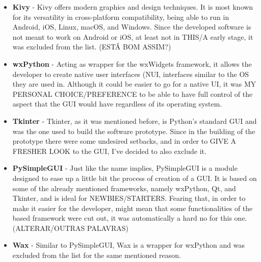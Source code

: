 \begin{itemize}
  \item \textbf{Kivy} - Kivy offers modern graphics and design techniques. It is most known for its versatility in cross-platform compatibility, being able to run in Android, iOS, Linux, macOS, and Windows. Since the developed software is not meant to work on Android or iOS, at least not in THIS/A early stage, it was excluded from the list. (ESTÁ BOM ASSIM?)\\
  
  \item \textbf{wxPython} - Acting as wrapper for the wxWidgets framework, it allows the developer to create native user interfaces (NUI, interfaces similar to the OS they are used in. Although it could be easier to go for a native UI, it was MY PERSONAL CHOICE/PREFERENCE to be able to have full control of the aspect that the GUI would have regardless of its operating system.\\
  
    \item \textbf{Tkinter} - Tkinter, as it was mentioned before, is Python's standard GUI and was the one used to build the software prototype. Since in the building of the prototype there were some undesired setbacks, and in order to GIVE A FRESHER LOOK to the GUI, I've decided to also exclude it. \\
  
  \item \textbf{PySimpleGUI} - Just like the name implies, PySimpleGUI is a module designed to ease up a little bit the process of creation of a GUI. It is based on some of the already mentioned frameworks, namely wxPython, Qt, and Tkinter, and is ideal for NEWBIES/STARTERS. Fearing that, in order to make it easier for the developer, might mean that some functionalities of the based framework were cut out, it was automatically a hard no for this one. (ALTERAR/OUTRAS PALAVRAS)\\
  
  \item \textbf{Wax} - Similar to PySimpleGUI, Wax is a wrapper for wxPython and was excluded from the list for the same mentioned reason.\\  
  
\end{itemize}


